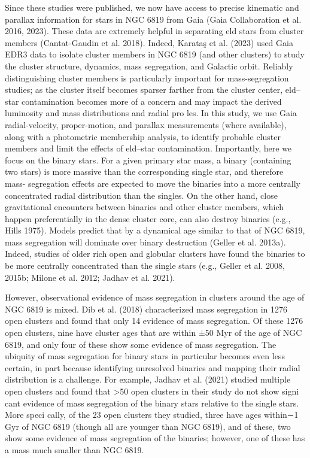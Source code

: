 \documentclass[../main.tex]{subfiles}
\begin{document}
{Since these studies were published, we now have access to
precise kinematic and parallax information for stars in NGC
6819 from Gaia (Gaia Collaboration et al. 2016, 2023). These
data are extremely helpful in separating eld stars from cluster
members (Cantat-Gaudin et al. 2018). Indeed, Karataş et al.
(2023) used Gaia EDR3 data to isolate cluster members in
NGC 6819 (and other clusters) to study the cluster structure,
dynamics, mass segregation, and Galactic orbit. Reliably
distinguishing cluster members is particularly important for
mass-segregation studies; as the cluster itself becomes sparser
farther from the cluster center, eld–star contamination
becomes more of a concern and may impact the derived
luminosity and mass distributions and radial pro les. In this
study, we use Gaia radial-velocity, proper-motion, and parallax
measurements (where available), along with a photometric
membership analysis, to identify probable cluster members and
limit the effects of eld–star contamination.
Importantly, here we focus on the binary stars. For a given
primary star mass, a binary (containing two stars) is more
massive than the corresponding single star, and therefore mass-
segregation effects are expected to move the binaries into a more
centrally concentrated radial distribution than the singles. On the
other hand, close gravitational encounters between binaries and
other cluster members, which happen preferentially in the dense cluster core, can also destroy binaries (e.g., Hills 1975). Models
predict that by a dynamical age similar to that of NGC 6819,
mass segregation will dominate over binary destruction (Geller
et al. 2013a). Indeed, studies of older rich open and globular
clusters have found the binaries to be more centrally
concentrated than the single stars (e.g., Geller et al. 2008,
2015b; Milone et al. 2012; Jadhav et al. 2021).

However, observational evidence of mass segregation in
clusters around the age of NGC 6819 is mixed. Dib et al.
(2018) characterized mass segregation in 1276 open clusters
and found that only 14%
evidence of mass segregation. Of these 1276 open clusters,
nine have cluster ages that are within ±50 Myr of the age of
NGC 6819, and only four of these show some evidence of mass
segregation. The ubiquity of mass segregation for binary stars
in particular becomes even less certain, in part because
identifying unresolved binaries and mapping their radial
distribution is a challenge. For example, Jadhav et al. (2021)
studied multiple open clusters and found that >50%
open clusters in their study do not show signi cant evidence of
mass segregation of the binary stars relative to the single stars.
More speci cally, of the 23 open clusters they studied, three
have ages within∼1 Gyr of NGC 6819 (though all are younger
than NGC 6819), and of these, two show some evidence of
mass segregation of the binaries; however, one of these has a
mass much smaller than NGC 6819.

}
\end{document}

